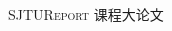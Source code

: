 \begin{frame}
\begin{columns}
\begin{column}{.45\textwidth}
\begin{figure}
\begin{subfigure}{\textwidth}
          \caption{\textsc{SJTUReport} 课程大论文}
        \end{subfigure}
        \begin{subfigure}{\textwidth}
          \centering

\end{subfigure}
\end{figure}
\end{column}
\end{columns}
\end{frame}
